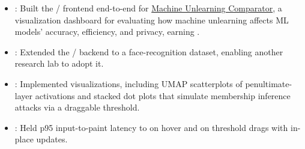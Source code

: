 \begin{itemize}
  \item {}: Built the / frontend end-to-end for \href{https://gnueaj.github.io/Machine-Unlearning-Comparator/}{Machine Unlearning Comparator}, a visualization dashboard for evaluating how machine unlearning affects ML models' accuracy, efficiency, and privacy, earning .
  \item {}: Extended the / backend to a face-recognition dataset, enabling another research lab to adopt it.
  \item {}: Implemented  visualizations, including  UMAP scatterplots of penultimate-layer activations and  stacked dot plots that simulate membership inference attacks via a draggable threshold.
  \item {}: Held p95 input-to-paint latency to  on hover and  on threshold drags with in-place  updates.
\end{itemize}
